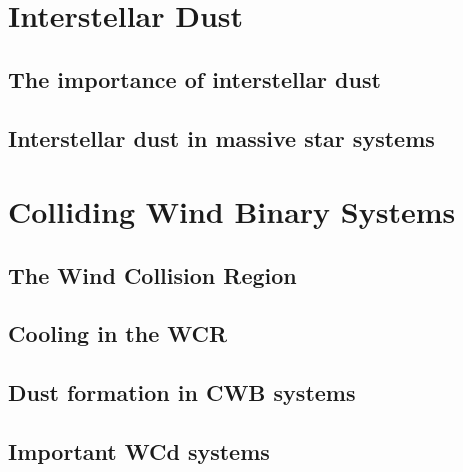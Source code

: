\section{Interstellar Dust}
\label{sec:dust}

\subsection{The importance of interstellar dust}
\label{sec:dustimportance}

\subsection{Interstellar dust in massive star systems}
\label{sec:dustmassivestars}

\section{Colliding Wind Binary Systems}
\label{sec:cwb}

\subsection{The Wind Collision Region}
\label{sec:wcr}





\subsection{Cooling in the WCR}
\label{sec:wcrcooling}





\subsection{Dust formation in CWB systems}
\label{sec:cwbdust}




\subsection{Important WCd systems}
\label{sec:knowndustysystems}

